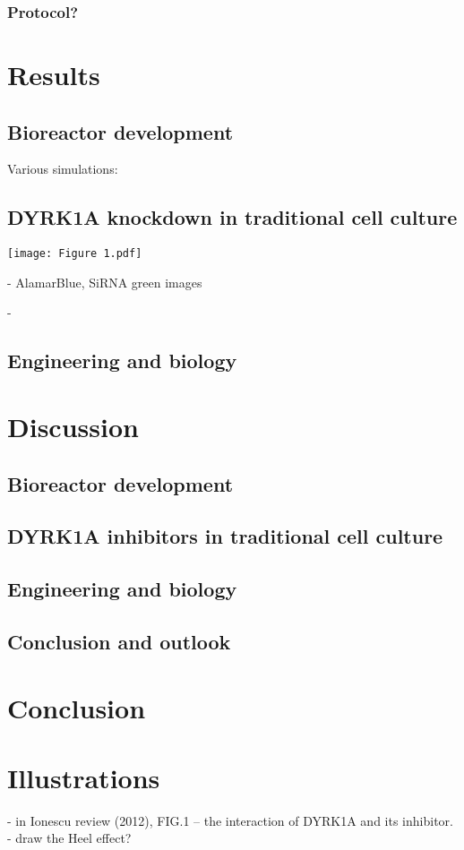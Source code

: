 \documentclass[onecolumn,10pt]{asme2ej}
\begin{document}
\subsubsection{Protocol?}  


\section{Results}
\subsection{Bioreactor development}
Various simulations:


\subsection{DYRK1A knockdown in traditional cell culture}
\texttt{[image: Figure 1.pdf]}




- AlamarBlue, SiRNA green images



-  

\subsection{Engineering and biology}


\section{Discussion}
\subsection{Bioreactor development}
\subsection{DYRK1A inhibitors in traditional cell culture}
\subsection{Engineering and biology}
\subsection{Conclusion and outlook}

\section{Conclusion}





\section{Illustrations}
- in Ionescu review (2012), FIG.1 -- the interaction of DYRK1A and its inhibitor.
- draw the Heel effect? 





%
%
%
\end{document}
